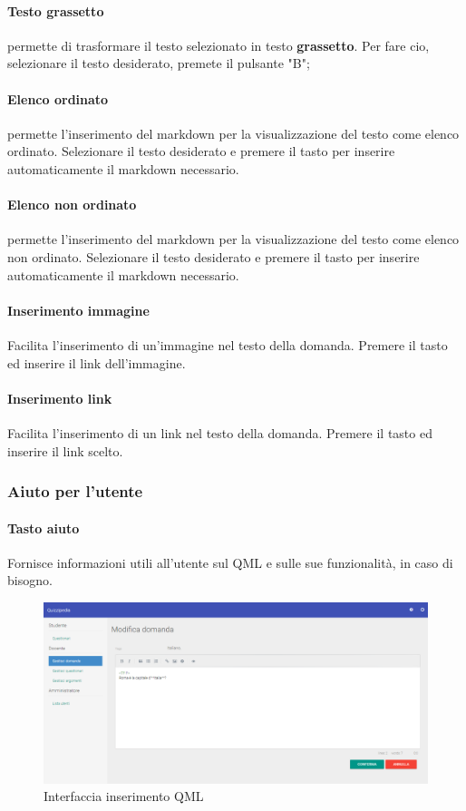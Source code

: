 \documentclass[12pt,a4paper]{article}
\begin{document}
	\paragraph{Testo grassetto} permette di trasformare il testo selezionato in testo \textbf{grassetto}. 
	Per fare cio, selezionare il testo desiderato, premete il pulsante "B";
	\paragraph{Elenco ordinato} permette l'inserimento del markdown per la visualizzazione del testo come elenco ordinato. 
	Selezionare il testo desiderato e premere il tasto per inserire automaticamente il markdown necessario.
	\paragraph{Elenco non ordinato}permette l'inserimento del markdown per la visualizzazione del testo come elenco non ordinato. 
	Selezionare il testo desiderato e premere il tasto per inserire automaticamente il markdown necessario.

	\paragraph{Inserimento immagine}
	Facilita l'inserimento di un'immagine nel testo della domanda. Premere il tasto ed inserire il link dell'immagine.
	\paragraph{Inserimento link}
		Facilita l'inserimento di un link nel testo della domanda. Premere il tasto ed inserire il link scelto.
   \subsubsection{Aiuto per l'utente}
	\paragraph{Tasto aiuto}
	Fornisce informazioni utili all'utente sul QML e sulle sue funzionalità, in caso di bisogno.
	\begin{figure}[H]	
		\centering
		\includegraphics[width=\linewidth]{../img/screenshot/modificaDomanda.png}
		\caption{Interfaccia inserimento QML}
		\label{Interfaccia inserimento QML}
	\end{figure}
	
\end{document}
